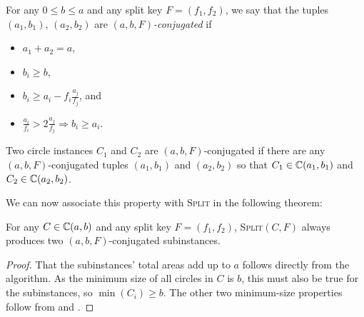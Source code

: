 \documentclass[a4paper,style=print,bibliography=totoc,nexus,lnum,extramargin]{tubsbook}
\begin{document}
\begin{definition}\label{def:conjugated}
    For any $0 \le b \le a$ and any split key $F = (f_1, f_2)$, we say that the tuples $(a_1, b_1)$, $(a_2, b_2)$ are \emph{$(a,b,F)$-conjugated} if

    \begin{itemize}
        \item $a_1 + a_2 = a$,
        \item $b_i \ge b$,
        \item $b_i \ge a_i - f_i \frac{a_j}{f_j}$, and
        \item $\frac{a_i}{f_i} > 2 \frac{a_j}{f_j} \Rightarrow b_i \ge a_i$.
    \end{itemize}
\end{definition}

\begin{definition}
    Two circle instances $C_1$ and $C_2$ are $(a,b,F)$-conjugated if there are any $(a,b,F)$-conjugated tuples $(a_1, b_1)$ and $(a_2, b_2)$ so that $C_1 \in \mathbb{C}(a_1, b_1)$ and $C_2 \in \mathbb{C}(a_2, b_2)$.
\end{definition}

We can now associate this property with \textsc{Split} in the following theorem:

\begin{theorem}\label{th:split-properties}
    For any $C \in \mathbb{C}(a,b)$ and any split key $F = (f_1, f_2)$, \textsc{Split}$(C,F)$ always produces two $(a,b,F)$-conjugated subinstances.
\end{theorem}

\begin{proof}
    That the subinstances' total areas add up to $a$ follows directly from the algorithm.
    As the minimum size of all circles in $C$ is $b$, this must also be true for the subinstances, so $\min(C_i) \ge b$.
    The other two minimum-size properties follow from  and .
\end{proof}
\end{document}
